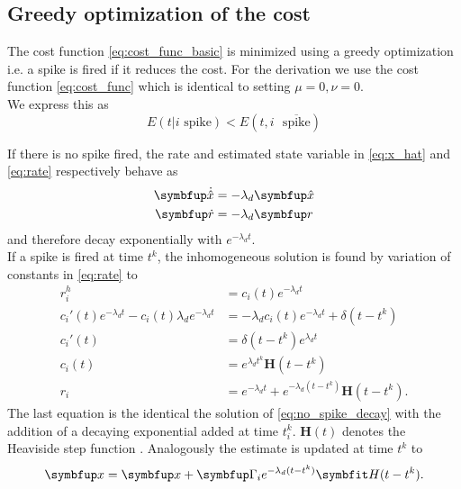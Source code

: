 \subsection{Greedy optimization of the cost}
The cost function \cref{eq:cost_func_basic} is minimized using a greedy optimization i.e. a spike is fired if it reduces the cost. For the derivation we use the cost function \cref{eq:cost_func} which is identical to setting $\mu = 0,\nu= 0$.\\
We express this as
\begin{equation}\label{eq:spike_condition}
	E(t|i \text{ spike}) < E(t,i \text{ }\overline{\text{spike}})
\end{equation}

If there is no spike fired, the rate and estimated state variable in \cref{eq:x_hat} and \cref{eq:rate} respectively behave as
\begin{equation}\label{eq:no_spike_decay}
\begin{aligned}
\bmu{\dot{\hat{x}}} &= -\lambda_d \bmu{\hat{x}}\\
\bmu{\dot{r}} &= -\lambda_d\bmu{r}
\end{aligned}
\end{equation}
and therefore decay exponentially with $e^{-\lambda_d t}$.\\
If a spike is fired at time $t^k$, the inhomogeneous solution is found by variation of constants in \cref{eq:rate} to
\begin{equation}\label{eq:rate_inhomo}
\begin{aligned}
r_i^h &= c_i(t)e^{-\lambda_d t}\\
c_i'(t) e^{-\lambda_d t} - c_i(t)\lambda_d e^{-\lambda_d t}&= -\lambda_d c_i(t)e^{-\lambda_d t} + \delta(t- t^k)\\
c_i'(t) &= \delta(t- t^k) e^{\lambda_d t}\\
c_i(t) &=  e^{\lambda_d t^k} \bm{H}(t-t^k)\\
r_i &=e^{-\lambda_d t} + e^{-\lambda_d (t-t^k)} \bm{H}(t-t^k).
\end{aligned}
\end{equation}
The last equation is the identical the solution of \cref{eq:no_spike_decay} with the addition of a decaying exponential added at time $t_i^k$. $\bm{H}(t)$ denotes the Heaviside step function . Analogously the estimate is updated at time $t^k$ to
\begin{equation}\label{eq:update_x_spike}
	\bmu{x} =  \bmu{x} + \bmu{\Gamma}_ie^{-\lambda_d (t-t^k)} \bm{H}(t-t^k).
\end{equation}

